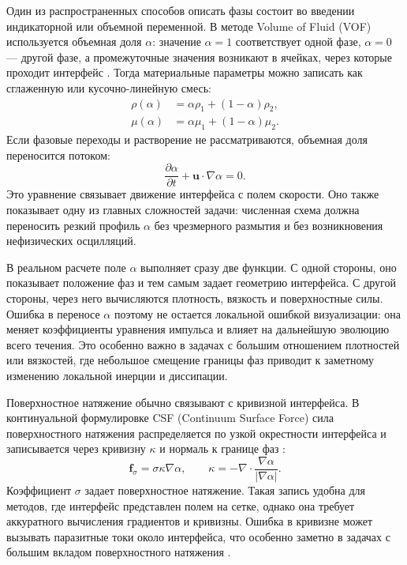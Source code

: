 \documentclass[12pt,a4paper]{article}
\begin{document}
Один из распространенных способов описать фазы состоит во введении
индикаторной или объемной переменной. В методе Volume of Fluid (VOF) используется
объемная доля \(\alpha\): значение \(\alpha=1\) соответствует одной фазе,
\(\alpha=0\) --- другой фазе, а промежуточные значения возникают в ячейках,
через которые проходит интерфейс \cite{Hirt1981}. Тогда материальные параметры
можно записать как сглаженную или кусочно-линейную смесь:
\begin{align}
    \rho(\alpha) &= \alpha\rho_1+(1-\alpha)\rho_2, \\
    \mu(\alpha) &= \alpha\mu_1+(1-\alpha)\mu_2.
\end{align}
Если фазовые переходы и растворение не рассматриваются, объемная доля
переносится потоком:
\begin{equation}
    \frac{\partial\alpha}{\partial t}
    +\mathbf{u}\cdot\nabla\alpha=0.
    \label{eq:review_alpha_transport}
\end{equation}
Это уравнение связывает движение интерфейса с полем скорости. Оно также
показывает одну из главных сложностей задачи: численная схема должна переносить
резкий профиль \(\alpha\) без чрезмерного размытия и без возникновения
нефизических осцилляций.

В реальном расчете поле \(\alpha\) выполняет сразу две функции. С одной
стороны, оно показывает положение фаз и тем самым задает геометрию интерфейса.
С другой стороны, через него вычисляются плотность, вязкость и поверхностные
силы. Ошибка в переносе \(\alpha\) поэтому не остается локальной ошибкой
визуализации: она меняет коэффициенты уравнения импульса и влияет на дальнейшую
эволюцию всего течения. Это особенно важно в задачах с большим отношением
плотностей или вязкостей, где небольшое смещение границы фаз приводит к
заметному изменению локальной инерции и диссипации.

Поверхностное натяжение обычно связывают с кривизной интерфейса. В
континуальной формулировке CSF (Continuum Surface Force) сила поверхностного
натяжения распределяется по узкой окрестности интерфейса и записывается через
кривизну \(\kappa\) и нормаль к границе фаз \cite{Brackbill1992}:
\begin{equation}
    \mathbf{f}_{\sigma}
    =
    \sigma\kappa\nabla\alpha,
    \qquad
    \kappa=-\nabla\cdot
    \frac{\nabla\alpha}{|\nabla\alpha|}.
    \label{eq:review_csf}
\end{equation}
Коэффициент \(\sigma\) задает поверхностное натяжение. Такая запись удобна для
методов, где интерфейс представлен полем на сетке, однако она требует
аккуратного вычисления градиентов и кривизны. Ошибка в кривизне может вызывать
паразитные токи около интерфейса, что особенно заметно в задачах с большим
вкладом поверхностного натяжения \cite{Popinet2018}.
\end{document}
